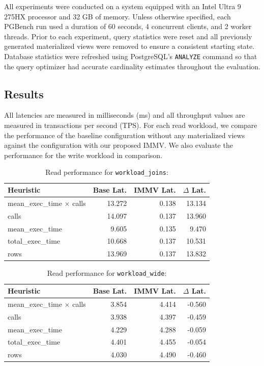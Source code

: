 All experiments were conducted on a system equipped with an Intel Ultra 9 275HX processor and 32 GB of memory. Unless otherwise specified, each PGBench run used a duration of 60 seconds, 4 concurrent clients, and 2 worker threads. Prior to each experiment, query statistics were reset and all previously generated materialized views were removed to ensure a consistent starting state. Database statistics were refreshed using PostgreSQL's \texttt{ANALYZE} command so that the query optimizer had accurate cardinality estimates throughout the evaluation.

\subsection{Results}

All latencies are measured in milliseconds (ms) and all throughput values are measured in transactions per second (TPS). For each read workload, we compare the performance of the baseline configuration without any materialized views against the configuration with our proposed IMMV. We also evaluate the performance for the write workload in comparison.

\begin{table}[t]
\centering

\label{tab:joins}
\begin{tabular}{lrrr}
\hline
Heuristic &
Base Lat. &
IMMV Lat. &
$\Delta$ Lat.\\
\hline
mean\_exec\_time $\times$ calls & 13.272 & 0.138 & 13.134 \\
calls                         & 14.097 & 0.137 & 13.960 \\
mean\_exec\_time              & 9.605  & 0.135 & 9.470  \\
total\_exec\_time             & 10.668 & 0.137 & 10.531 \\
rows                          & 13.969 & 0.137 & 13.832 \\
\hline
\end{tabular}
\caption{Read performance for \texttt{workload\_joins}:}
\end{table}

\begin{table}[t]
\centering

\label{tab:wide}
\begin{tabular}{lrrr}
\hline
Heuristic &
Base Lat. &
IMMV Lat. &
$\Delta$ Lat.\\
\hline
mean\_exec\_time $\times$ calls & 3.854 & 4.414 & -0.560  \\
calls                         & 3.938 & 4.397 & -0.459  \\
mean\_exec\_time              & 4.229 & 4.288 & -0.059 \\
total\_exec\_time             & 4.401 & 4.455 & -0.054 \\
rows                          & 4.030 & 4.490 & -0.460 \\
\hline
\end{tabular}
\caption{Read performance for \texttt{workload\_wide}:}

\end{table}

